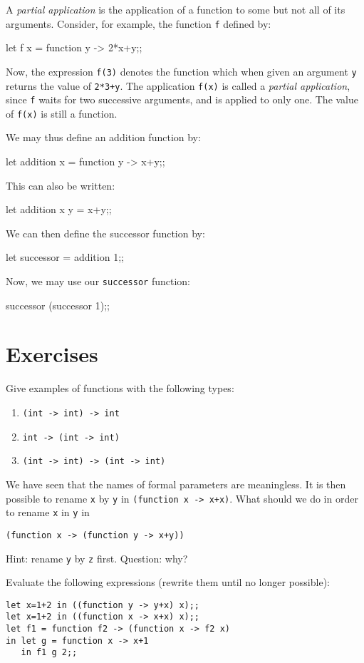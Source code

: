 A {\em partial application} is the application of a function to some
but not all of its arguments.
Consider, for example, the function {\tt f} defined by:
\begin{caml_example}
let f x = function y -> 2*x+y;;
\end{caml_example}
Now, the expression \verb|f(3)| denotes the function which when given an
argument \verb|y| returns the value of \verb|2*3+y|. The application
\verb|f(x)| is called a {\em partial application}, since {\tt f} waits for
two successive arguments, and is applied to only one. The value of {\tt f(x)}
is still a function.

We may thus define an addition function by:
\begin{caml_example}
let addition x = function y -> x+y;;
\end{caml_example}
This can also be written:
\begin{caml_example}
let addition x y = x+y;;
\end{caml_example}
We can then define the successor function by:
\begin{caml_example}
let successor = addition 1;;
\end{caml_example}
Now, we may use our \verb|successor| function:
\begin{caml_example}
successor (successor 1);;
\end{caml_example}

\section*{Exercises}

\begin{exo}\label{Fund:1}
Give examples of functions with the following types:
\begin{enumerate}
\item \verb|(int -> int) -> int|
\item \verb|int -> (int -> int)|
\item \verb|(int -> int) -> (int -> int)|
\end{enumerate}
\end{exo}
%
\begin{exo}\label{Fund:2}
We have seen that the names of formal parameters are meaningless. It is then
possible to rename \verb"x" by \verb"y" in \verb"(function x -> x+x)". What
should we do in order to rename \verb"x" in \verb"y" in
\begin{verbatim}
(function x -> (function y -> x+y))
\end{verbatim}
Hint: rename \verb"y" by \verb"z" first. Question: why?
\end{exo}
%
\begin{exo}\label{Fund:3}
Evaluate the following expressions (rewrite them until no longer possible):
\begin{verbatim}
let x=1+2 in ((function y -> y+x) x);;
let x=1+2 in ((function x -> x+x) x);;
let f1 = function f2 -> (function x -> f2 x)
in let g = function x -> x+1
   in f1 g 2;;
\end{verbatim}
\end{exo}
